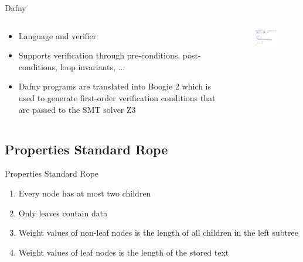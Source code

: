 \documentclass{beamer}
\begin{document}
\begin{frame}{Dafny}
  \begin{columns}
    \begin{column}{0.5\textwidth}
        \begin{itemize}
            \item Language and verifier
            \item Supports verification through pre-conditions, post-conditions, loop invariants, ...
            \item Dafny programs are translated into Boogie 2 which is used to generate first-order verification conditions that are passed to the SMT solver Z3
        \end{itemize}
    \end{column}
    \begin{column}{0.5\textwidth}
      \begin{figure}
          \centering
          \includegraphics[width=5.5cm]{images/dafny.png}
      \end{figure}
    \end{column}
  \end{columns}
\end{frame}

\subsection{Properties Standard Rope}

\begin{frame}{Properties Standard Rope}
    \begin{enumerate}
        \item Every node has at most two children
        \item Only leaves contain data
        \item Weight values of non-leaf nodes is the length of all children in the left subtree
        \item Weight values of leaf nodes is the length of the stored text
    \end{enumerate}
\end{frame}
\end{document}
